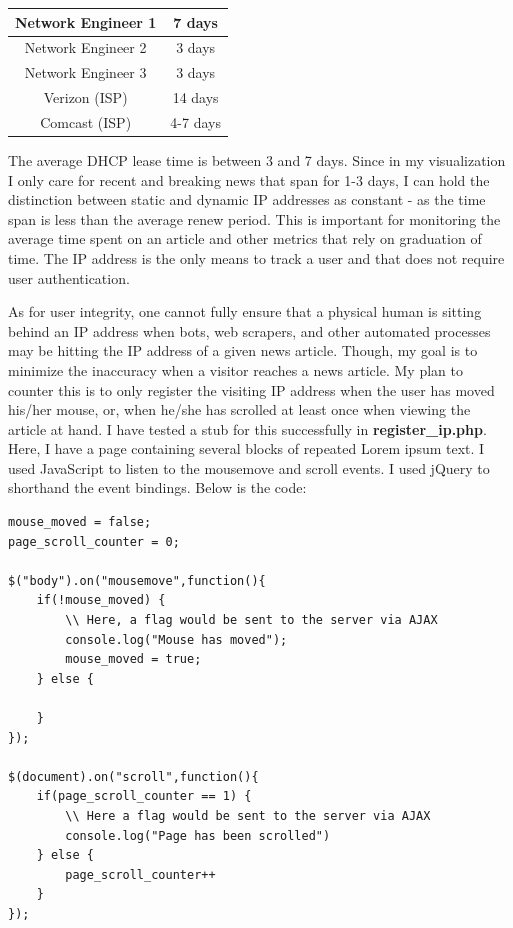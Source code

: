 \documentclass[12pt]{article}
\begin{document}
\begin{tabular}{| c | c |}
  \hline                       
  Network Engineer 1 & 7 days \\[1ex] \hline
  Network Engineer 2 & 3 days \\[1ex] \hline
  Network Engineer 3 & 3 days \\ [1ex] \hline
  Verizon (ISP) & 14 days \\[1ex] \hline
  Comcast (ISP) & 4-7 days \\[1ex]
  \hline  
\end{tabular}
\vspace{0.3in}

The average DHCP lease time is between 3 and 7 days. Since in my visualization I only care for recent and breaking news that span for 1-3 days, I can hold the distinction between static and dynamic IP addresses as constant - as the time span is less than the average renew period. This is important for monitoring the average time spent on an article and other metrics that rely on graduation of time. The IP address is the only means to track a user and that does not require user authentication. 

As for user integrity, one cannot fully ensure that a physical human is sitting behind an IP address when bots, web scrapers, and other automated processes may be hitting the IP address of a given news article. Though, my goal is to minimize the inaccuracy when a visitor reaches a news article. My plan to counter this is to only register the visiting IP address when the user has moved his/her mouse, or, when he/she has scrolled at least once when viewing the article at hand. I have tested a stub for this successfully in \textbf{register\_ip.php}. Here, I have a page containing several blocks of repeated Lorem ipsum text. I used JavaScript to listen to the mousemove and scroll events. I used jQuery to shorthand the event bindings. Below is the code:
\begin{lstlisting}[basicstyle=\scriptsize]
mouse_moved = false;
page_scroll_counter = 0;

$("body").on("mousemove",function(){
	if(!mouse_moved) {
		\\ Here, a flag would be sent to the server via AJAX
		console.log("Mouse has moved");
		mouse_moved = true;
	} else {
		
	}
});

$(document).on("scroll",function(){
	if(page_scroll_counter == 1) {
		\\ Here a flag would be sent to the server via AJAX
		console.log("Page has been scrolled")
	} else {
		page_scroll_counter++
	}
});
\end{lstlisting}        
\end{document}
